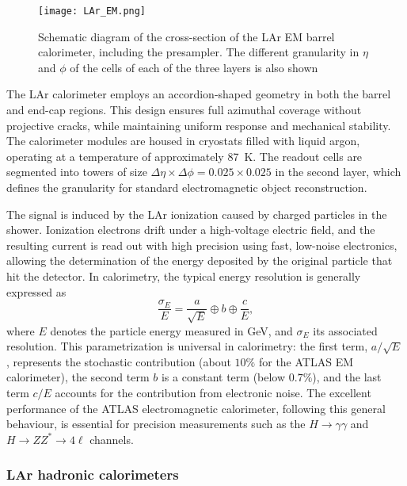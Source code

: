 \begin{figure}[htbp]
    \centering
        \texttt{[image: LAr\_EM.png]}
    \caption{Schematic diagram of the cross-section of the LAr EM barrel calorimeter, including the presampler. The different granularity in $\eta$ and $\phi$ of the cells of each of the three layers is also shown~\cite{ATLAS:exp}}
    \label{fig:LAr_EM}
\end{figure}

The LAr calorimeter employs an accordion-shaped geometry in both the barrel and end-cap regions. This design ensures full azimuthal coverage without projective cracks, while maintaining uniform response and mechanical stability. The calorimeter modules are housed in cryostats filled with liquid argon, operating at a temperature of approximately 87~K. The readout cells are segmented into towers of size $\Delta\eta \times \Delta\phi = 0.025 \times 0.025$ in the second layer, which defines the granularity for standard electromagnetic object reconstruction.

The signal is induced by the LAr ionization caused by charged particles in the shower. Ionization electrons drift under a high-voltage electric field, and the resulting current is read out with high precision using fast, low-noise electronics, allowing the determination of the energy deposited by the original particle that hit the detector. In calorimetry, the typical energy resolution is generally expressed as
\begin{equation}
\frac{\sigma_E}{E} = \frac{a}{\sqrt{E}} \oplus b \oplus \frac{c}{E},
\end{equation}
where $E$ denotes the particle energy measured in GeV, and $\sigma_E$ its associated resolution. This parametrization is universal in calorimetry: the first term, $a/\sqrt{E}$, represents the stochastic contribution (about $10\%$ for the ATLAS EM calorimeter), the second term $b$ is a constant term (below $0.7\%$), and the last term $c/E$ accounts for the contribution from electronic noise. The excellent performance of the ATLAS electromagnetic calorimeter, following this general behaviour, is essential for precision measurements such as the $H \rightarrow \gamma\gamma$ and $H \rightarrow ZZ^* \rightarrow 4\ell$ channels.

\subsubsection{LAr hadronic calorimeters}
\label{sec:elehad}

